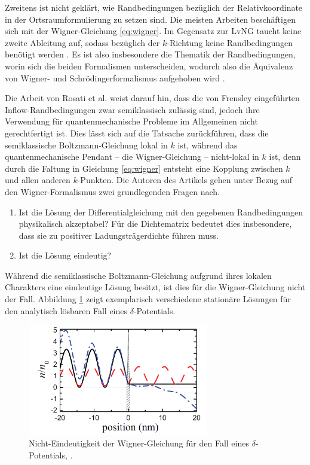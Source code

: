 Zweitens ist nicht geklärt, wie Randbedingungen bezüglich der Relativkoordinate in der Ortsraumformulierung zu setzen sind. Die meisten Arbeiten beschäftigen sich mit der Wigner-Gleichung \eqref{eq:wigner}. Im Gegensatz zur LvNG taucht keine zweite Ableitung auf, sodass bezüglich der $k$-Richtung keine Randbedingungen benötigt werden \cite{frensley2}.
Es ist also insbesondere die Thematik der Randbedingungen, worin sich die beiden Formalismen unterscheiden, wodurch also die Äquivalenz von Wigner- und Schrödingerformalismus aufgehoben wird \cite{li2014stationary}.

Die Arbeit von Rosati et al. \cite{failure} weist darauf hin, dass die von Frensley eingeführten Inflow-Randbedingungen zwar semiklassisch zulässig sind, jedoch ihre Verwendung für quantenmechanische Probleme im Allgemeinen nicht gerechtfertigt ist. Dies lässt sich auf die Tatsache zurückführen, dass die semiklassische Boltzmann-Gleichung lokal in $k$ ist, während das quantenmechanische Pendant -- die Wigner-Gleichung -- nicht-lokal in $k$ ist, denn durch die Faltung in Gleichung \eqref{eq:wigner} entsteht eine Kopplung zwischen $k$ und allen anderen $k$-Punkten.
Die Autoren  des Artikels gehen unter Bezug auf den Wigner-Formalismus zwei grundlegenden Fragen nach.
\begin{enumerate}[label=(\roman*)]
  \item Ist die Lösung der Differentialgleichung mit den gegebenen Randbedingungen physikalisch akzeptabel? Für die Dichtematrix bedeutet dies insbesondere, dass sie zu positiver Ladungsträgerdichte führen muss.
  \item Ist die Lösung eindeutig?
\end{enumerate}
Während die semiklassische Boltzmann-Gleichung aufgrund ihres lokalen Charakters eine eindeutige Lösung besitzt, ist dies für die Wigner-Gleichung nicht der Fall. Abbildung \ref{fig:nonuniqueness} zeigt exemplarisch verschiedene stationäre Lösungen für den analytisch lösbaren Fall eines $\delta$-Potentials.
\begin{figure}
  \centering
  \includegraphics[width=0.7\textwidth]{files/nonuniqueness.png}
  \caption{Nicht-Eindeutigkeit der Wigner-Gleichung für den Fall eines $\delta$-Potentials, \cite{failure}.}
  \label{fig:nonuniqueness}
\end{figure}
